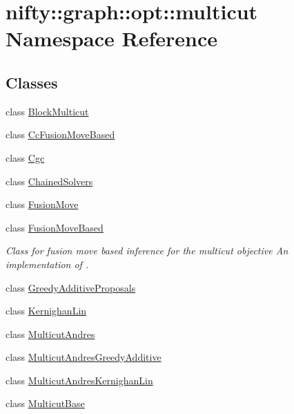 \hypertarget{namespacenifty_1_1graph_1_1opt_1_1multicut}{}\section{nifty\+:\+:graph\+:\+:opt\+:\+:multicut Namespace Reference}
\label{namespacenifty_1_1graph_1_1opt_1_1multicut}
\subsection*{Classes}
\begin{DoxyCompactItemize}
\item 
class \hyperlink{classnifty_1_1graph_1_1opt_1_1multicut_1_1BlockMulticut}{Block\+Multicut}
\item 
class \hyperlink{classnifty_1_1graph_1_1opt_1_1multicut_1_1CcFusionMoveBased}{Cc\+Fusion\+Move\+Based}
\item 
class \hyperlink{classnifty_1_1graph_1_1opt_1_1multicut_1_1Cgc}{Cgc}
\item 
class \hyperlink{classnifty_1_1graph_1_1opt_1_1multicut_1_1ChainedSolvers}{Chained\+Solvers}
\item 
class \hyperlink{classnifty_1_1graph_1_1opt_1_1multicut_1_1FusionMove}{Fusion\+Move}
\item 
class \hyperlink{classnifty_1_1graph_1_1opt_1_1multicut_1_1FusionMoveBased}{Fusion\+Move\+Based}
\begin{DoxyCompactList}\small\item\em Class for fusion move based inference for the multicut objective An implementation of \cite{beier_15_funsion}. \end{DoxyCompactList}\item 
class \hyperlink{classnifty_1_1graph_1_1opt_1_1multicut_1_1GreedyAdditiveProposals}{Greedy\+Additive\+Proposals}
\item 
class \hyperlink{classnifty_1_1graph_1_1opt_1_1multicut_1_1KernighanLin}{Kernighan\+Lin}
\item 
class \hyperlink{classnifty_1_1graph_1_1opt_1_1multicut_1_1MulticutAndres}{Multicut\+Andres}
\item 
class \hyperlink{classnifty_1_1graph_1_1opt_1_1multicut_1_1MulticutAndresGreedyAdditive}{Multicut\+Andres\+Greedy\+Additive}
\item 
class \hyperlink{classnifty_1_1graph_1_1opt_1_1multicut_1_1MulticutAndresKernighanLin}{Multicut\+Andres\+Kernighan\+Lin}
\item 
class \hyperlink{classnifty_1_1graph_1_1opt_1_1multicut_1_1MulticutBase}{Multicut\+Base}

\end{DoxyCompactItemize}
